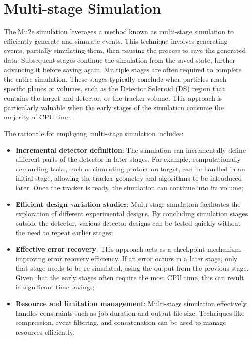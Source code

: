 \section{Multi-stage Simulation}

The Mu2e simulation leverages a method known as multi-stage 
simulation to efficiently generate and simulate events. This 
technique involves generating events, partially simulating them, 
then pausing the process to save the generated data. Subsequent 
stages continue the simulation from the saved state, further 
advancing it before saving again. Multiple stages are often 
required to complete the entire simulation. These stages typically 
conclude when particles reach specific planes or volumes, such as 
the Detector Solenoid (DS) region that contains the target and 
detector, or the tracker volume. This approach is particularly 
valuable when the early stages of the simulation consume the 
majority of CPU time.

The rationale for employing multi-stage simulation includes:

\begin{itemize}
    \item \textbf{Incremental detector definition}: The simulation can 
    incrementally define different parts of the detector in later stages. 
    For example, computationally demanding tasks, such as simulating protons 
    on target, can be handled in an initial stage, allowing the tracker 
    geometry and algorithms to be introduced later. Once the tracker is 
    ready, the simulation can continue into its volume;
    \item \textbf{Efficient design variation studies}: Multi-stage 
    simulation facilitates the exploration of different experimental 
    designs. By concluding simulation stages outside the detector, 
    various detector designs can be tested quickly without the need to repeat earlier stages;
    \item \textbf{Effective error recovery}: This approach acts as a 
    checkpoint mechanism, improving error recovery efficiency. If an 
    error occurs in a later stage, only that stage needs to be re-simulated, 
    using the output from the previous stage. Given that the early stages 
    often require the most CPU time, this can result in significant time savings;
    \item \textbf{Resource and limitation management}: Multi-stage simulation 
    effectively handles constraints such as job duration and output file size. 
    Techniques like compression, event filtering, and concatenation can be used 
    to manage resources efficiently.
\end{itemize}

